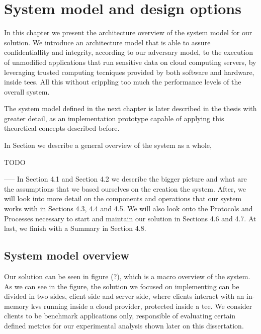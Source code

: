 \chapter{System model and design options}
\label{cha:systemModel_and_designOptions}

In this chapter we present the architecture overview of the system model for our solution. We introduce an architecture model that is able to assure confidentiallity and integrity, according to our adversary model, to the execution of unmodified applications that run sensitive data on cloud computing servers, by leveraging trusted computing tecniques provided by both software and hardware, inside \gls{tee}s. All this without crippling too much the performance levels of the overall system.

The system model defined in the next chapter is later described in the thesis with greater detail, as an implementation prototype capable of applying this theoretical concepts described before.

In Section \cite{sec:systemModel_overview} we describe a general overview of the system as a whole, 

TODO


-----
In Section
4.1 and Section 4.2 we describe the bigger picture and what are the assumptions that
we based ourselves on the creation the system. After, we will look into more detail on
the components and operations that our system works with in Sections 4.3, 4.4 and 4.5.
We will also look onto the Protocols and Processes necessary to start and maintain our
solution in Sections 4.6 and 4.7. At last, we finish with a Summary in Section 4.8.



\section{System model overview} %
\label{sec:systemModel_overview}

Our solution can be seen in figure (?), which is a macro overview of the system. As we can see in the figure, the solution we focused on implementing can be divided in two sides, client side and server side, where clients interact with an in-memory \gls{kvs} running inside a cloud provider, protected inside a \gls{tee}. 
We consider clients to be benchmark applications only, responsible of evaluating certain defined metrics for our experimental analysis shown later on this dissertation.

